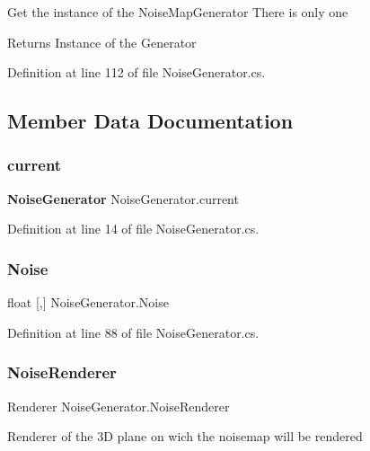 Get the instance of the Noise\+Map\+Generator There is only one 

\begin{DoxyReturn}{Returns}
Instance of the Generator
\end{DoxyReturn}


Definition at line 112 of file Noise\+Generator.\+cs.



\subsection{Member Data Documentation}
\mbox{\label{class_noise_generator_a69151437d945e3407c8c5769eaac803e}} 
\subsubsection{current}
{\footnotesize\ttfamily \textbf{ Noise\+Generator} Noise\+Generator.\+current\hspace{0.3cm}{\ttfamily [static]}}



Definition at line 14 of file Noise\+Generator.\+cs.

\mbox{\label{class_noise_generator_a495ac4e77295a601b53f00b327abe7ea}} 
\subsubsection{Noise}
{\footnotesize\ttfamily float [,] Noise\+Generator.\+Noise}



Definition at line 88 of file Noise\+Generator.\+cs.

\mbox{\label{class_noise_generator_aa5d85d1027a000657274ce9faadac6ec}} 
\subsubsection{Noise\+Renderer}
{\footnotesize\ttfamily Renderer Noise\+Generator.\+Noise\+Renderer}



Renderer of the 3D plane on wich the noisemap will be rendered 



